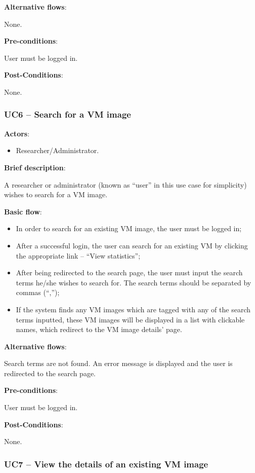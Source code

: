 \textbf{Alternative flows}:

None.

\textbf{Pre-conditions}:

User must be logged in.

\textbf{Post-Conditions}:

None.

\subsubsection{UC6 -- Search for a VM image}\label{uc6}

\textbf{Actors}:

\begin{itemize}
\item Researcher/Administrator.
\end{itemize}

\textbf{Brief description}:

A researcher or administrator (known as ``user'' in this use case for simplicity) wishes to search for a VM image.

\textbf{Basic flow}:

\begin{itemize}
\item In order to search for an existing VM image, the user must be logged in;
\item After a successful login, the user can search for an existing VM by clicking the appropriate link -- ``View statistics'';
\item After being redirected to the search page, the user must input the search terms he/she wishes to search for. The search terms should be separated by commas (``,'');
\item If the system finds any VM images which are tagged with any of the search terms inputted, these VM images will be displayed in a list with clickable names, which redirect to the VM image details' page.
\end{itemize}

\textbf{Alternative flows}:

Search terms are not found. An error message is displayed and the user is redirected to the search page.

\textbf{Pre-conditions}:

User must be logged in.

\textbf{Post-Conditions}:

None.

\subsubsection{UC7 -- View the details of an existing VM image}\label{uc7}


